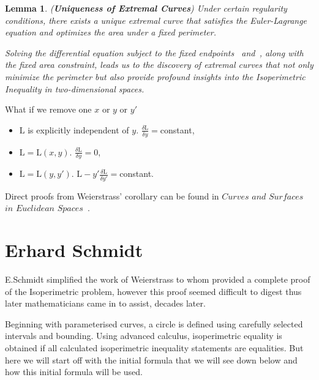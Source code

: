 \documentclass[a4paper]{book}
\newtheorem{lemma}[theorem]{Lemma}%
\numberwithin{theorem}{section}%
\begin{document}
\begin{lemma}(\textbf{Uniqueness of Extremal Curves})
    Under certain regularity conditions, there exists a unique extremal curve that satisfies the Euler-Lagrange equation and optimizes the area under a fixed perimeter.

    Solving the differential equation subject to the fixed endpoints~\citep{goldstein1980classical} and~\citep{hilbert1985methods}, along with the fixed area constraint, leads us to the discovery of extremal curves that not only minimize the perimeter but also provide profound insights into the Isoperimetric Inequality in two-dimensional spaces. 
\end{lemma}
\newpage
What if we remove one $x$ or $y$ or $y'$
\begin{itemize}
    \item $\mathrm{L}$ is explicitly independent of $y$. $\frac{\delta\mathrm{L}}{\delta y}=$constant,
    \item $\mathrm{L}=\mathrm{L}(x,y)$. $\frac{\delta\mathrm{L}}{\delta y}=0$,
    \item $\mathrm{L}=\mathrm{L}(y,y')$. $\mathrm{L}-y'\frac{\delta\mathrm{L}}{\delta y'}=$constant.
\end{itemize}

Direct proofs from Weierstrass' corollary can be found in $Curves$ $and$ $Surfaces$ $in$ $Euclidean$ $Spaces$~\citep{chern1966curves}.

\section{Erhard Schmidt}
E.Schmidt simplified the work of Weierstrass to whom provided a complete proof of the Isoperimetric problem, however this proof seemed difficult to digest thus later mathematicians came in to assist, decades later. 

Beginning with parameterised curves, a circle is defined using carefully selected intervals and bounding. Using advanced calculus, isoperimetric equality is obtained if all calculated isoperimetric inequality statements are equalities. But here we will start off with the initial formula that we will see down below and how this initial formula will be used.
\end{document}
